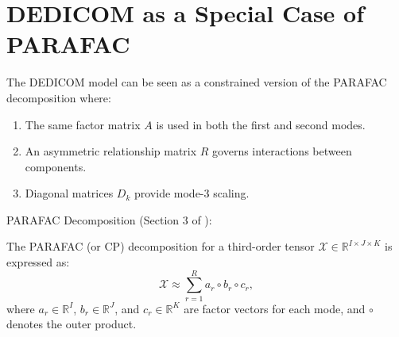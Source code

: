     
    
    

\section{DEDICOM as a Special Case of PARAFAC}
\label{sec:dedicom-to-parafac}

The DEDICOM model can be seen as a constrained version of the PARAFAC decomposition where:
\begin{enumerate}
    \item The same factor matrix \( A \) is used in both the first and second modes.
    \item An asymmetric relationship matrix \( R \) governs interactions between components.
    \item Diagonal matrices \( D_k \) provide mode-3 scaling.
\end{enumerate}

PARAFAC Decomposition (Section 3 of \cite{kolda2009tensor}):

The PARAFAC (or CP) decomposition for a third-order tensor \( \mathcal{X} \in \mathbb{R}^{I \times J \times K} \) is expressed as:
\begin{equation}
    \mathcal{X} \approx \sum_{r=1}^{R} a_r \circ b_r \circ c_r,
\end{equation}
where \( a_r \in \mathbb{R}^I \), \( b_r \in \mathbb{R}^J \), and \( c_r \in \mathbb{R}^K \) are factor vectors for each mode, and \( \circ \) denotes the outer product.

